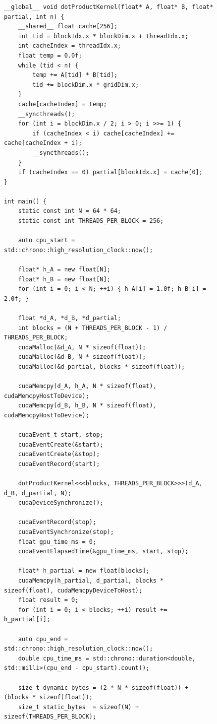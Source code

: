 \documentclass{article}
\begin{document}
\begin{figure}[H]
\begin{minipage}[t]{0.49\textwidth}
\begin{verbatim}
__global__ void dotProductKernel(float* A, float* B, float* partial, int n) {
    __shared__ float cache[256];
    int tid = blockIdx.x * blockDim.x + threadIdx.x;
    int cacheIndex = threadIdx.x;
    float temp = 0.0f;
    while (tid < n) {
        temp += A[tid] * B[tid];
        tid += blockDim.x * gridDim.x;
    }
    cache[cacheIndex] = temp;
    __syncthreads();
    for (int i = blockDim.x / 2; i > 0; i >>= 1) {
        if (cacheIndex < i) cache[cacheIndex] += cache[cacheIndex + i];
        __syncthreads();
    }
    if (cacheIndex == 0) partial[blockIdx.x] = cache[0];
}

int main() {
    static const int N = 64 * 64;
    static const int THREADS_PER_BLOCK = 256;

    auto cpu_start = std::chrono::high_resolution_clock::now();

    float* h_A = new float[N];
    float* h_B = new float[N];
    for (int i = 0; i < N; ++i) { h_A[i] = 1.0f; h_B[i] = 2.0f; }

    float *d_A, *d_B, *d_partial;
    int blocks = (N + THREADS_PER_BLOCK - 1) / THREADS_PER_BLOCK;
    cudaMalloc(&d_A, N * sizeof(float));
    cudaMalloc(&d_B, N * sizeof(float));
    cudaMalloc(&d_partial, blocks * sizeof(float));

    cudaMemcpy(d_A, h_A, N * sizeof(float), cudaMemcpyHostToDevice);
    cudaMemcpy(d_B, h_B, N * sizeof(float), cudaMemcpyHostToDevice);

    cudaEvent_t start, stop;
    cudaEventCreate(&start);
    cudaEventCreate(&stop);
    cudaEventRecord(start);

    dotProductKernel<<<blocks, THREADS_PER_BLOCK>>>(d_A, d_B, d_partial, N);
    cudaDeviceSynchronize();

    cudaEventRecord(stop);
    cudaEventSynchronize(stop);
    float gpu_time_ms = 0;
    cudaEventElapsedTime(&gpu_time_ms, start, stop);

    float* h_partial = new float[blocks];
    cudaMemcpy(h_partial, d_partial, blocks * sizeof(float), cudaMemcpyDeviceToHost);
    float result = 0;
    for (int i = 0; i < blocks; ++i) result += h_partial[i];

    auto cpu_end = std::chrono::high_resolution_clock::now();
    double cpu_time_ms = std::chrono::duration<double, std::milli>(cpu_end - cpu_start).count();

    size_t dynamic_bytes = (2 * N * sizeof(float)) + (blocks * sizeof(float));
    size_t static_bytes  = sizeof(N) + sizeof(THREADS_PER_BLOCK);


\end{verbatim}
\end{minipage}
\end{figure}
\end{document}
